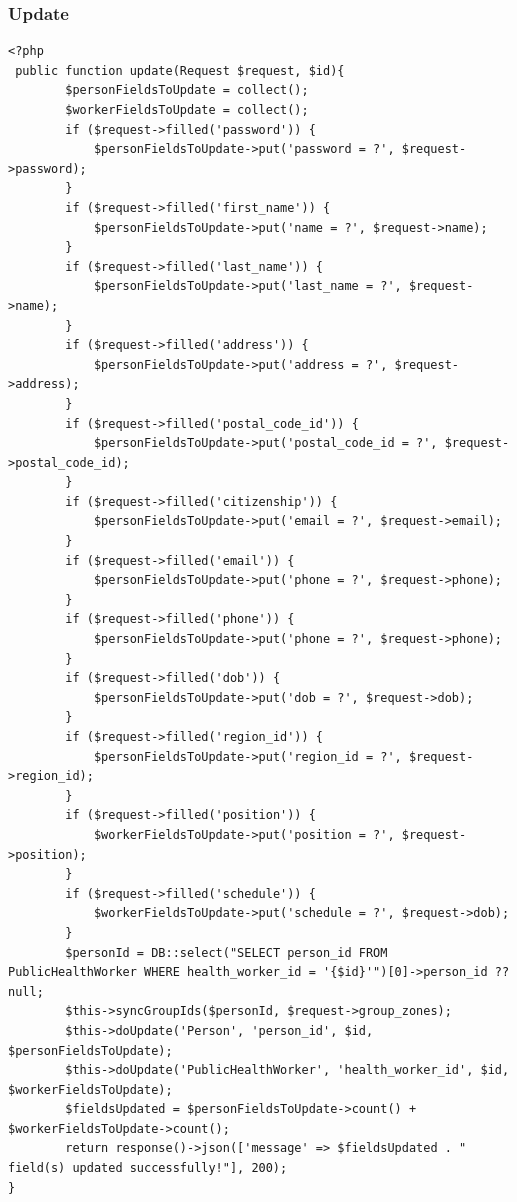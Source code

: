 \subsubsection{Update}
\begin{verbatim}
<?php
 public function update(Request $request, $id){
        $personFieldsToUpdate = collect();
        $workerFieldsToUpdate = collect();
        if ($request->filled('password')) {
            $personFieldsToUpdate->put('password = ?', $request->password);
        }
        if ($request->filled('first_name')) {
            $personFieldsToUpdate->put('name = ?', $request->name);
        }
        if ($request->filled('last_name')) {
            $personFieldsToUpdate->put('last_name = ?', $request->name);
        }
        if ($request->filled('address')) {
            $personFieldsToUpdate->put('address = ?', $request->address);
        }
        if ($request->filled('postal_code_id')) {
            $personFieldsToUpdate->put('postal_code_id = ?', $request->postal_code_id);
        }
        if ($request->filled('citizenship')) {
            $personFieldsToUpdate->put('email = ?', $request->email);
        }
        if ($request->filled('email')) {
            $personFieldsToUpdate->put('phone = ?', $request->phone);
        }
        if ($request->filled('phone')) {
            $personFieldsToUpdate->put('phone = ?', $request->phone);
        }
        if ($request->filled('dob')) {
            $personFieldsToUpdate->put('dob = ?', $request->dob);
        }
        if ($request->filled('region_id')) {
            $personFieldsToUpdate->put('region_id = ?', $request->region_id);
        }
        if ($request->filled('position')) {
            $workerFieldsToUpdate->put('position = ?', $request->position);
        }
        if ($request->filled('schedule')) {
            $workerFieldsToUpdate->put('schedule = ?', $request->dob);
        }
        $personId = DB::select("SELECT person_id FROM PublicHealthWorker WHERE health_worker_id = '{$id}'")[0]->person_id ?? null;
        $this->syncGroupIds($personId, $request->group_zones);
        $this->doUpdate('Person', 'person_id', $id, $personFieldsToUpdate);
        $this->doUpdate('PublicHealthWorker', 'health_worker_id', $id, $workerFieldsToUpdate);
        $fieldsUpdated = $personFieldsToUpdate->count() + $workerFieldsToUpdate->count();
        return response()->json(['message' => $fieldsUpdated . " field(s) updated successfully!"], 200);
}

\end{verbatim}

